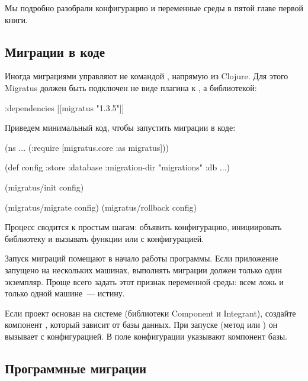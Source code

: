 Мы подробно разобрали конфигурацию и переменные среды в пятой главе первой книги.

\subsection{Миграции в коде}

Иногда миграциями управляют не командой , напрямую из Clojure. Для этого Migratus должен быть подключен не виде плагина к , а библиотекой:

\begin{english}
  \begin{clojure}
{:dependencies [[migratus "1.3.5"]]}
  \end{clojure}
\end{english}

Приведем минимальный код, чтобы запустить миграции в коде:

\begin{english}
  \begin{clojure}
(ns ...
  (:require
   [migratus.core :as migratus]))

(def config
  {:store :database
   :migration-dir "migrations"
   :db {...}})

(migratus/init config)

(migratus/migrate config)
(migratus/rollback config)
  \end{clojure}
\end{english}

Процесс сводится к простым шагам: объявить конфигурацию, инициировать библиотеку и вызывать функции  или  с конфигурацией.

Запуск миграций помещают в начало работы программы. Если приложение запущено на нескольких машинах, выполнять миграции должен только один экземпляр. Проще всего задать этот признак переменной среды: всем ложь и только одной машине~--- истину.

Если проект основан на системе (библиотеки Component и Integrant), создайте компонент , который зависит от базы данных. При запуске (метод  или ) он вызывает  с конфигурацией. В поле  конфигурации указывают компонент базы.

\subsection{Программные миграции}

